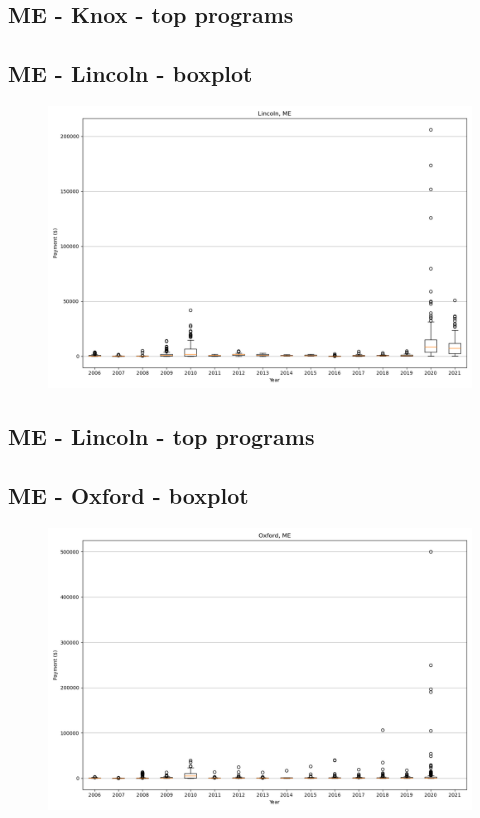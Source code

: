\subsection*{ME - Knox - top programs}

\newpage
\subsection*{ME - Lincoln - boxplot}
\begin{figure}[h]
\centering
\includegraphics[width=7in]{../output/boxplots/counties/Lincoln-ME_boxplot.png}
\end{figure}


\subsection*{ME - Lincoln - top programs}

\newpage
\subsection*{ME - Oxford - boxplot}
\begin{figure}[h]
\centering
\includegraphics[width=7in]{../output/boxplots/counties/Oxford-ME_boxplot.png}
\end{figure}


